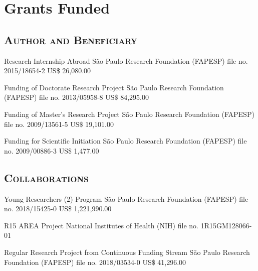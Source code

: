 
\section{Grants Funded}

\vspace{.5em}
	\subsection{\textsc{Author and Beneficiary}}
\vspace{.5em}

{Research Internship Abroad}
{São Paulo Research Foundation (FAPESP)}
{file no. 2015/18654-2}
{US\$ 26,080.00}{}

{Funding of Doctorate Research Project}
{São Paulo Research Foundation (FAPESP)}
{file no. 2013/05958-8}
{US\$ 84,295.00}{}

{Funding of Master's Research Project}
{São Paulo Research Foundation (FAPESP)}
{file no. 2009/13561-5}
{US\$ 19,101.00}{}

{Funding for Scientific Initiation}
{São Paulo Research Foundation (FAPESP)}
{file no. 2009/00886-3}
{US\$ 1,477.00}{}

\vspace{.5em}
	\subsection{\textsc{Collaborations}}
\vspace{.5em}

{Young Researchers (2) Program}
{São Paulo Research Foundation (FAPESP)}
{file no. 2018/15425-0}
{US\$ 1,221,990.00}{}

{R15 AREA Project}
{National Institutes of Health (NIH)}
{file no. 1R15GM128066-01}
{}{}

{Regular Research Project from Continuous Funding Stream}
{São Paulo Research Foundation (FAPESP)}
{file no. 2018/03534-0}
{US\$ 41,296.00}{}